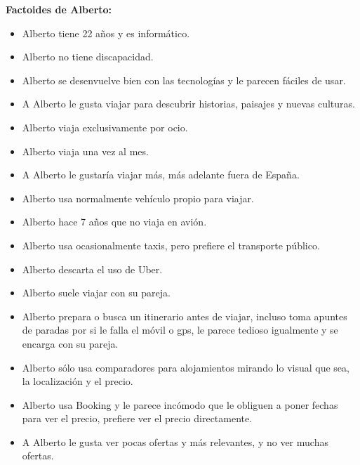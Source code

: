 \textbf{Factoides de Alberto:}

\begin{itemize}
    \item Alberto tiene 22 años y es informático.
    \item Alberto no tiene discapacidad.
    \item Alberto se desenvuelve bien con las tecnologías y le parecen fáciles de usar.
    \item A Alberto le gusta viajar para descubrir historias, paisajes y nuevas culturas.
    \item Alberto viaja exclusivamente por ocio.
    \item Alberto viaja una vez al mes.
    \item A Alberto le gustaría viajar más, más adelante fuera de España.
    \item Alberto usa normalmente vehículo propio para viajar.
    \item Alberto hace 7 años que no viaja en avión.
    \item Alberto usa ocasionalmente taxis, pero prefiere el transporte público.
    \item Alberto descarta el uso de Uber.
    \item Alberto suele viajar con su pareja.
    \item Alberto prepara o busca un itinerario antes de viajar, incluso toma apuntes de paradas por si le falla el móvil o gps, le parece tedioso igualmente y se encarga con su pareja.
    \item Alberto sólo usa comparadores para alojamientos mirando lo visual que sea, la localización y el precio.
    \item Alberto usa Booking y le parece incómodo que le obliguen a poner fechas para ver el precio, prefiere ver el precio directamente.
    \item A Alberto le gusta ver pocas ofertas y más relevantes, y no ver muchas ofertas.
\end{itemize}


